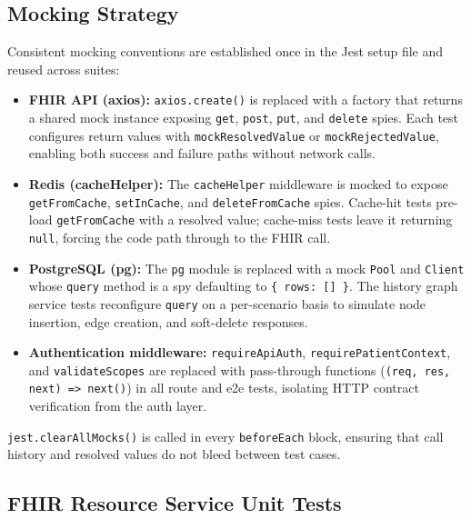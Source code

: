 \subsection{Mocking Strategy}

Consistent mocking conventions are established once in the Jest setup file and
reused across suites:

\begin{itemize}
  \item \textbf{FHIR API (axios):} \texttt{axios.create()} is replaced with a
        factory that returns a shared mock instance exposing \texttt{get},
        \texttt{post}, \texttt{put}, and \texttt{delete} spies. Each test
        configures return values with \texttt{mockResolvedValue} or
        \texttt{mockRejectedValue}, enabling both success and failure paths
        without network calls.
  \item \textbf{Redis (cacheHelper):} The \texttt{cacheHelper} middleware is
        mocked to expose \texttt{getFromCache}, \texttt{setInCache}, and
        \texttt{deleteFromCache} spies. Cache-hit tests pre-load
        \texttt{getFromCache} with a resolved value; cache-miss tests leave it
        returning \texttt{null}, forcing the code path through to the FHIR call.
  \item \textbf{PostgreSQL (pg):} The \texttt{pg} module is replaced with a
        mock \texttt{Pool} and \texttt{Client} whose \texttt{query} method is a
        spy defaulting to \texttt{\{ rows: [] \}}. The history graph service
        tests reconfigure \texttt{query} on a per-scenario basis to simulate
        node insertion, edge creation, and soft-delete responses.
  \item \textbf{Authentication middleware:} \texttt{requireApiAuth},
        \texttt{requirePatientContext}, and \texttt{validateScopes} are replaced
        with pass-through functions (\texttt{(req, res, next) => next()}) in all
        route and e2e tests, isolating HTTP contract verification from the
        auth layer.
\end{itemize}

\texttt{jest.clearAllMocks()} is called in every \texttt{beforeEach} block,
ensuring that call history and resolved values do not bleed between test cases.

\subsection{FHIR Resource Service Unit Tests}

